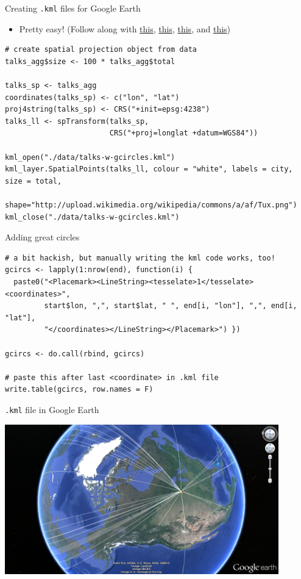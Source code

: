 \documentclass[sans,aspectratio=169,presentation,bigger,fleqn]{beamer}
\begin{document}
\begin{frame}[fragile,label=sec-22]{Creating \texttt{.kml} files for Google Earth}
 \begin{itemize}
\item Pretty easy! (Follow along with \href{http://www.nceas.ucsb.edu/scicomp/usecases/shapeFileToKML}{this}, \href{http://stackoverflow.com/questions/7813141/how-to-create-a-kml-file-using-r}{this}, \href{http://stackoverflow.com/questions/21487010/assistance-with-name-and-styleurl-in-kml-when-using-writeogr-from-rgdal}{this}, and \href{http://gsif.isric.org/doku.php?id=wiki:tutorial_plotkml}{this})
\end{itemize}

\scriptsize
\begin{verbatim}
# create spatial projection object from data
talks_agg$size <- 100 * talks_agg$total

talks_sp <- talks_agg
coordinates(talks_sp) <- c("lon", "lat")
proj4string(talks_sp) <- CRS("+init=epsg:4238")
talks_ll <- spTransform(talks_sp,
                        CRS("+proj=longlat +datum=WGS84"))

kml_open("./data/talks-w-gcircles.kml")
kml_layer.SpatialPoints(talks_ll, colour = "white", labels = city, size = total,
                        shape="http://upload.wikimedia.org/wikipedia/commons/a/af/Tux.png")
kml_close("./data/talks-w-gcircles.kml")
\end{verbatim}
\normalsize
\end{frame}
\begin{frame}[fragile,label=sec-23]{Adding great circles}
 \scriptsize
\begin{verbatim}
# a bit hackish, but manually writing the kml code works, too!
gcircs <- lapply(1:nrow(end), function(i) {
  paste0("<Placemark><LineString><tesselate>1</tesselate><coordinates>",
         start$lon, ",", start$lat, " ", end[i, "lon"], ",", end[i, "lat"],
         "</coordinates></LineString></Placemark>") })

gcircs <- do.call(rbind, gcircs)

# paste this after last <coordinate> in .kml file
write.table(gcircs, row.names = F)
\end{verbatim}
\normalsize
\end{frame}
\begin{frame}[fragile,label=sec-24]{\texttt{.kml} file in Google Earth}
 \begin{center}
\includegraphics[height=6.5cm]{./img/talks-w-gcircles-kml.png}
\end{center}
\end{frame}
\end{document}
